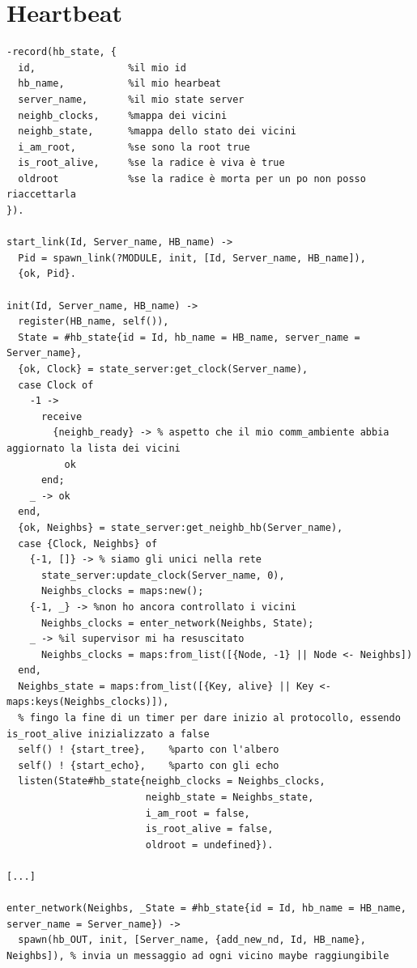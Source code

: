 \documentclass[italian]{memoir}
\begin{document}
\chapter{Heartbeat}\label{code:heartbeat}
\begin{verbatim}
-record(hb_state, {
  id,                %il mio id
  hb_name,           %il mio hearbeat
  server_name,       %il mio state server 
  neighb_clocks,     %mappa dei vicini
  neighb_state,      %mappa dello stato dei vicini
  i_am_root,         %se sono la root true
  is_root_alive,     %se la radice è viva è true
  oldroot            %se la radice è morta per un po non posso riaccettarla
}).

start_link(Id, Server_name, HB_name) ->
  Pid = spawn_link(?MODULE, init, [Id, Server_name, HB_name]),
  {ok, Pid}.

init(Id, Server_name, HB_name) ->
  register(HB_name, self()),
  State = #hb_state{id = Id, hb_name = HB_name, server_name = Server_name},
  {ok, Clock} = state_server:get_clock(Server_name),
  case Clock of
    -1 ->
      receive
        {neighb_ready} -> % aspetto che il mio comm_ambiente abbia aggiornato la lista dei vicini
          ok
      end;
    _ -> ok
  end,
  {ok, Neighbs} = state_server:get_neighb_hb(Server_name),
  case {Clock, Neighbs} of
    {-1, []} -> % siamo gli unici nella rete
      state_server:update_clock(Server_name, 0),
      Neighbs_clocks = maps:new();
    {-1, _} -> %non ho ancora controllato i vicini
      Neighbs_clocks = enter_network(Neighbs, State);
    _ -> %il supervisor mi ha resuscitato
      Neighbs_clocks = maps:from_list([{Node, -1} || Node <- Neighbs])
  end,
  Neighbs_state = maps:from_list([{Key, alive} || Key <- maps:keys(Neighbs_clocks)]),
  % fingo la fine di un timer per dare inizio al protocollo, essendo is_root_alive inizializzato a false
  self() ! {start_tree},    %parto con l'albero
  self() ! {start_echo},    %parto con gli echo
  listen(State#hb_state{neighb_clocks = Neighbs_clocks,
                        neighb_state = Neighbs_state, 
                        i_am_root = false, 
                        is_root_alive = false, 
                        oldroot = undefined}).

[...]

enter_network(Neighbs, _State = #hb_state{id = Id, hb_name = HB_name, server_name = Server_name}) ->
  spawn(hb_OUT, init, [Server_name, {add_new_nd, Id, HB_name}, Neighbs]), % invia un messaggio ad ogni vicino maybe raggiungibile


\end{verbatim}
\end{document}
